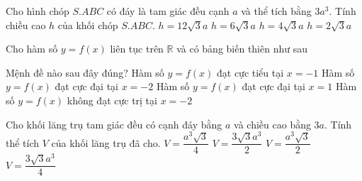 \begin{ex}%
Cho hình chóp $S.ABC$ có đáy là tam giác đều cạnh $a$ và thể tích bằng $3a^3$. Tính chiều cao $h$ của khối chóp $S.ABC$.
\choice
{\True $h=12\sqrt3 a$}
{$h=6\sqrt3 a$}
{$h=4\sqrt3 a$}
{$h=2\sqrt3 a$}
\end{ex}

\begin{ex}%
Cho hàm số $y=f(x)$ liên tục trên $\mathbb R$ và có bảng biến thiên như sau
\begin{center}
\end{center}
Mệnh đề nào sau đây đúng?
\choice
{Hàm số $y=f(x)$ đạt cực tiểu tại $x=-1$}
{\True Hàm số $y=f(x)$ đạt cực đại tại $x=-2$}
{Hàm số $y=f(x)$ đạt cực đại tại $x=1$}
{Hàm số $y=f(x)$ không đạt cực trị tại $x=-2$}
\end{ex}

\begin{ex}%
Cho khối lăng trụ tam giác đều có cạnh đáy bằng $a$ và chiều cao bằng $3a$. Tính thể tích $V$ của khối lăng trụ đã cho.
\choice
{$V=\dfrac{a^3\sqrt3}{4}$}
{$V=\dfrac{3\sqrt3a^3}{2}$}
{$V=\dfrac{a^3\sqrt3}{2}$}
{\True $V=\dfrac{3\sqrt3a^3}{4}$}
\end{ex}

